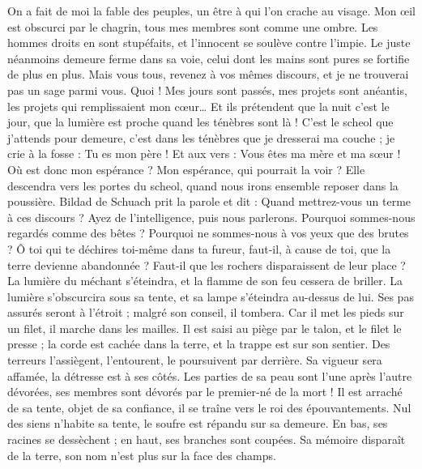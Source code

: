 \begin{multicols}{2}
On a fait de moi la fable des peuples, un être à qui l'on crache au visage.
Mon œil est obscurci par le chagrin, tous mes membres sont comme une ombre.
Les hommes droits en sont stupéfaits, et l'innocent se soulève contre l'impie.
Le juste néanmoins demeure ferme dans sa voie, celui dont les mains sont pures se fortifie de plus en plus.
Mais vous tous, revenez à vos mêmes discours, et je ne trouverai pas un sage parmi vous.
Quoi ! Mes jours sont passés, mes projets sont anéantis, les projets qui remplissaient mon cœur…
Et ils prétendent que la nuit c'est le jour, que la lumière est proche quand les ténèbres sont là !
C'est le scheol que j'attends pour demeure, c'est dans les ténèbres que je dresserai ma couche ;
je crie à la fosse : Tu es mon père ! Et aux vers : Vous êtes ma mère et ma sœur !
Où est donc mon espérance ? Mon espérance, qui pourrait la voir ?
Elle descendra vers les portes du scheol, quand nous irons ensemble reposer dans la poussière.
\VerseOne{}Bildad de Schuach prit la parole et dit :
Quand mettrez-vous un terme à ces discours ? Ayez de l'intelligence, puis nous parlerons.
Pourquoi sommes-nous regardés comme des bêtes ? Pourquoi ne sommes-nous à vos yeux que des brutes ?
Ô toi qui te déchires toi-même dans ta fureur, faut-il, à cause de toi, que la terre devienne abandonnée ? Faut-il que les rochers disparaissent de leur place ?
La lumière du méchant s'éteindra, et la flamme de son feu cessera de briller.
La lumière s'obscurcira sous sa tente, et sa lampe s'éteindra au-dessus de lui.
Ses pas assurés seront à l'étroit ; malgré son conseil, il tombera.
Car il met les pieds sur un filet, il marche dans les mailles.
Il est saisi au piège par le talon, et le filet le presse ;
la corde est cachée dans la terre, et la trappe est sur son sentier.
Des terreurs l'assiègent, l'entourent, le poursuivent par derrière.
Sa vigueur sera affamée, la détresse est à ses côtés.
Les parties de sa peau sont l'une après l'autre dévorées, ses membres sont dévorés par le premier-né de la mort !
Il est arraché de sa tente, objet de sa confiance, il se traîne vers le roi des épouvantements.
Nul des siens n'habite sa tente, le soufre est répandu sur sa demeure.
En bas, ses racines se dessèchent ; en haut, ses branches sont coupées.
Sa mémoire disparaît de la terre, son nom n'est plus sur la face des champs.

\end{multicols}

